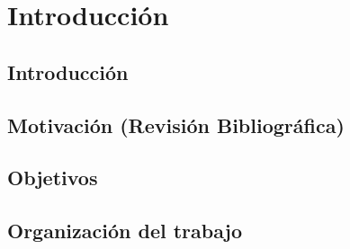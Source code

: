 \chapter{Introducción}
\label{intro}

\section{Introducción}

\section{Motivación (Revisión Bibliográfica)}

\section{Objetivos}

\section{Organización del trabajo}